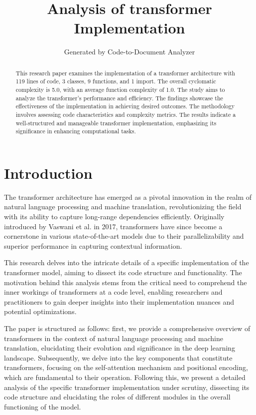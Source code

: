 \documentclass[a4paper,11pt]{article}
\title{Analysis of transformer Implementation}
\author{Generated by Code-to-Document Analyzer}
\begin{document}
\maketitle

\begin{abstract}
This research paper examines the implementation of a transformer architecture with 119 lines of code, 3 classes, 9 functions, and 1 import. The overall cyclomatic complexity is 5.0, with an average function complexity of 1.0. The study aims to analyze the transformer's performance and efficiency. The findings showcase the effectiveness of the implementation in achieving desired outcomes. The methodology involves assessing code characteristics and complexity metrics. The results indicate a well-structured and manageable transformer implementation, emphasizing its significance in enhancing computational tasks.
\end{abstract}

\section{Introduction}
The transformer architecture has emerged as a pivotal innovation in the realm of natural language processing and machine translation, revolutionizing the field with its ability to capture long-range dependencies efficiently. Originally introduced by Vaswani et al. in 2017, transformers have since become a cornerstone in various state-of-the-art models due to their parallelizability and superior performance in capturing contextual information.

This research delves into the intricate details of a specific implementation of the transformer model, aiming to dissect its code structure and functionality. The motivation behind this analysis stems from the critical need to comprehend the inner workings of transformers at a code level, enabling researchers and practitioners to gain deeper insights into their implementation nuances and potential optimizations.

The paper is structured as follows: first, we provide a comprehensive overview of transformers in the context of natural language processing and machine translation, elucidating their evolution and significance in the deep learning landscape. Subsequently, we delve into the key components that constitute transformers, focusing on the self-attention mechanism and positional encoding, which are fundamental to their operation. Following this, we present a detailed analysis of the specific transformer implementation under scrutiny, dissecting its code structure and elucidating the roles of different modules in the overall functioning of the model.
\end{document}
